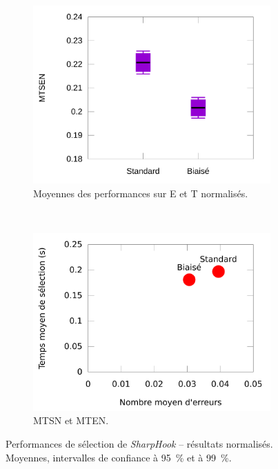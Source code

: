 \begin{figure}[!htb]
\begin{subfigure}[t]{0.49\textwidth}
			\includegraphics[width=\textwidth]{figures/ch5/hookNormProducts}
			\caption{Moyennes des performances sur E et T normalisés.}
			\label{fig:hookNormProducts}
		\end{subfigure}
		~
		\begin{subfigure}[t]{0.49\textwidth}
			\centering
			\includegraphics[width=\textwidth]{figures/ch5/normHookErrorsTimesScatter}
			\caption{MTSN et MTEN.}
			\label{fig:normHookErrorsTimesScatter}
		\end{subfigure}
		\caption[\emph{SharpHook} -- résultats normalisés]{Performances de sélection de \emph{SharpHook} -- résultats normalisés. Moyennes, intervalles de confiance à 95~\%{} et à 99~\%{}.}
		\label{fig:normHookPerfs}
	\end{figure}
	
